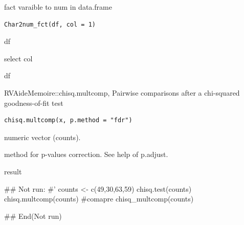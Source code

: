 \documentclass[a4paper]{book}
\begin{document}
%
\begin{Description}
fact varaible to num  in data.frame
\end{Description}
%
\begin{Usage}
\begin{verbatim}
Char2num_fct(df, col = 1)
\end{verbatim}
\end{Usage}
%
\begin{Arguments}
\begin{ldescription}
\item[\code{df}] df

\item[\code{col}] select col
\end{ldescription}
\end{Arguments}
%
\begin{Value}
df
\end{Value}

%
\begin{Description}
RVAideMemoire::chisq.multcomp, Pairwise comparisons after a chi-squared goodness-of-fit test
\end{Description}
%
\begin{Usage}
\begin{verbatim}
chisq.multcomp(x, p.method = "fdr")
\end{verbatim}
\end{Usage}
%
\begin{Arguments}
\begin{ldescription}
\item[\code{x}] numeric vector (counts).

\item[\code{p.method}] method for p-values correction. See help of p.adjust.
\end{ldescription}
\end{Arguments}
%
\begin{Value}
result
\end{Value}
%
\begin{Examples}
\begin{ExampleCode}

\#\# Not run: 
#'
counts <- c(49,30,63,59)
chisq.test(counts)
chisq.multcomp(counts)
#comapre
chisq_multcomp(counts)


## End(Not run)
\end{ExampleCode}
\end{Examples}
\end{document}
